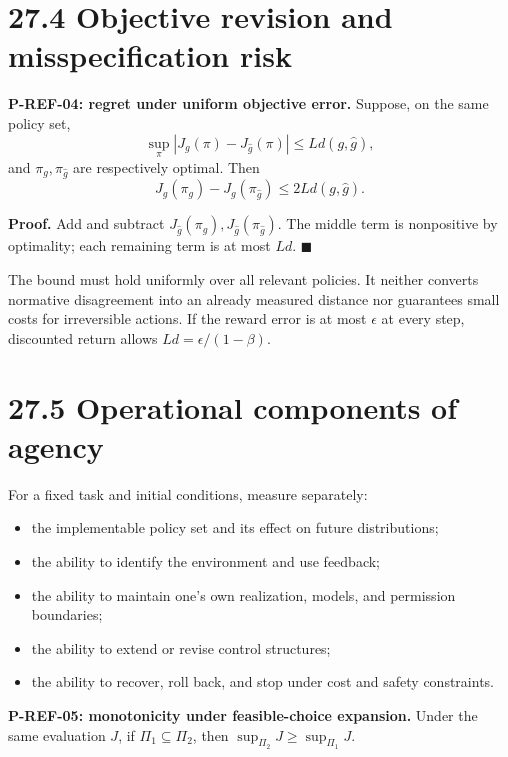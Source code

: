 \documentclass[
  english,
  11pt,
  oneside]{book}
\providecommand{\tightlist}{%
  \setlength{\itemsep}{0pt}\setlength{\parskip}{0pt}}
\begin{document}
\section{27.4 Objective revision and misspecification risk}\label{objective-revision-and-misspecification-risk}

\hypertarget{p-ref-04}{}\label{p-ref-04}

\textbf{P-REF-04: regret under uniform objective error.} Suppose, on the same policy set, \[\sup_\pi|J_g(\pi)-J_{\hat g}(\pi)|
\le Ld(g,\hat g),\] and \(\pi_g,\pi_{\hat g}\) are respectively optimal. Then \[J_g(\pi_g)-J_g(\pi_{\hat g})\le2L d(g,\hat g).\]

\textbf{Proof.} Add and subtract \(J_{\hat g}(\pi_g),J_{\hat g}(\pi_{\hat g})\). The middle term is nonpositive by optimality; each remaining term is at most \(Ld\). \(\blacksquare\)

The bound must hold uniformly over all relevant policies. It neither converts normative disagreement into an already measured distance nor guarantees small costs for irreversible actions. If the reward error is at most \(\epsilon\) at every step, discounted return allows \(Ld=\epsilon/(1-\beta)\).

\section{27.5 Operational components of agency}\label{operational-components-of-agency}

For a fixed task and initial conditions, measure separately:

\begin{itemize}
\tightlist
\item
  the implementable policy set and its effect on future distributions;
\item
  the ability to identify the environment and use feedback;
\item
  the ability to maintain one's own realization, models, and permission boundaries;
\item
  the ability to extend or revise control structures;
\item
  the ability to recover, roll back, and stop under cost and safety constraints.
\end{itemize}

\hypertarget{p-ref-05}{}\label{p-ref-05}

\textbf{P-REF-05: monotonicity under feasible-choice expansion.} Under the same evaluation \(J\), if \(\Pi_1\subseteq\Pi_2\), then \(\sup_{\Pi_2}J\ge\sup_{\Pi_1}J\).
\end{document}
